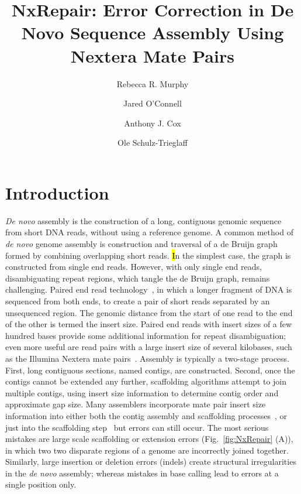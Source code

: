 \documentclass[fleqn,10pt]{wlpeerj}
\title{NxRepair: Error Correction in De Novo Sequence Assembly Using Nextera Mate Pairs}
\author[1]{Rebecca R. Murphy}
\author[2]{Jared O'Connell}
\author[2]{Anthony J. Cox}
\author[2]{Ole Schulz-Trieglaff}
\affil[1]{Department of Chemistry, University of Cambridge, UK}
\affil[2]{Illumina Cambridge, Chesterford Research Park, Essex, CB10 1XL}
\begin{document}
\flushbottom
\maketitle
\thispagestyle{empty}

\section*{Introduction}

\textit{De novo} assembly is the construction of a long, contiguous genomic sequence from short DNA reads, without using a reference genome. A common method of \textit{de novo} genome assembly is construction and traversal of a de Bruijn graph~\citep{compeau2011} formed by combining overlapping short reads. {\hl In the simplest case, the graph is constructed from single end reads. However, with only single end reads, disambiguating repeat regions, which tangle the de Bruijn graph, remains challenging. Paired end read technology~\citep{Fullwood2009}, in which a longer fragment of DNA is sequenced from both ends, to create a pair of short reads separated by an unsequenced region. The genomic distance from the start of one read to the end of the other is termed the insert size. Paired end reads with insert sizes of a few hundred bases provide some additional information for repeat disambiguation; even more useful are read pairs with a large insert size of several kilobases, such as the Illumina Nextera mate pairs~\citep{nextera2012}. Assembly is typically a two-stage process. First, long contiguous sections, named contigs, are constructed. Second, once the contigs cannot be extended any further, scaffolding algorithms attempt to join multiple contigs, using insert size information to determine contig order and approximate gap size. Many assemblers incorporate mate pair insert size information into either both the contig assembly and scaffolding processes~\citep{Bankevich2012}, or just into the scaffolding step~\citep{zerbino2008} but errors can still occur. The most serious mistakes are large scale scaffolding or extension errors (Fig.~\ref{fig:NxRepair} (A)), in which two two disparate regions of a genome are incorrectly joined together. Similarly, large insertion or deletion errors (indels) create structural irregularities in the \textit{de novo} assembly; whereas mistakes in base calling lead to errors at a single position only.} 
\end{document}
